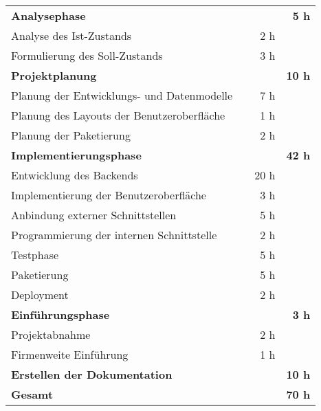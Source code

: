 \begin{tabularx}{\textwidth}{Xrrr}
\rowcolor{heading}\textbf{Analysephase} & \textbf{} & \textbf{} & \textbf{5 h} \\
Analyse des Ist-Zustands &       & 2 h   &  \\
\rowcolor{odd}Formulierung des Soll-Zustands &       & 3 h   &  \\
\rowcolor{heading}\textbf{Projektplanung} & \textbf{} & \textbf{} & \textbf{10 h} \\
Planung der Entwicklungs- und Datenmodelle &       & 7 h   &  \\
\rowcolor{odd}Planung des Layouts der Benutzeroberfläche &       & 1 h   &  \\
Planung der Paketierung &       & 2 h   &  \\
\rowcolor{heading}\textbf{Implementierungsphase} & \textbf{} & \textbf{} & \textbf{42 h} \\
Entwicklung des Backends &       & 20 h   &  \\
\rowcolor{odd} Implementierung der Benutzeroberfläche &       & 3 h   &  \\
Anbindung externer Schnittstellen &       & 5 h  &  \\
\rowcolor{odd}Programmierung der internen Schnittstelle &       & 2 h   &  \\
Testphase &       & 5 h   &  \\
\rowcolor{odd}Paketierung &       & 5 h   &  \\
Deployment &       & 2 h   &  \\
\rowcolor{heading}\textbf{Einführungsphase} & \textbf{} & \textbf{} & \textbf{3 h} \\
Projektabnahme &       & 2 h   &  \\
\rowcolor{odd}Firmenweite Einführung &      & 1 h   &  \\
\rowcolor{heading}\textbf{Erstellen der Dokumentation} & \textbf{} & \textbf{} & \textbf{10 h} \\
\hline
\hline
\rowcolor{odd}\textbf{Gesamt} & \textbf{} & \textbf{} & \textbf{70 h} \\
\end{tabularx}
